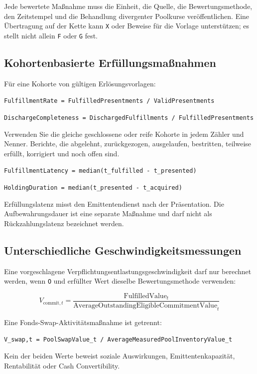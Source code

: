 \documentclass[11pt]{article}
\begin{document}
Jede bewertete Maßnahme muss die Einheit, die Quelle, die Bewertungsmethode, den Zeitstempel und die Behandlung divergenter Poolkurse veröffentlichen. Eine Übertragung auf der Kette kann \texttt{X} oder Beweise für die Vorlage unterstützen; es stellt nicht allein \texttt{F} oder \texttt{G} fest.

\subsection*{Kohortenbasierte Erfüllungsmaßnahmen}

Für eine Kohorte von gültigen Erlösungsvorlagen:

\texttt{FulfillmentRate = FulfilledPresentments / ValidPresentments}

\texttt{DischargeCompleteness = DischargedFulfillments / FulfilledPresentments}

Verwenden Sie die gleiche geschlossene oder reife Kohorte in jedem Zähler und Nenner. Berichte, die abgelehnt, zurückgezogen, ausgelaufen, bestritten, teilweise erfüllt, korrigiert und noch offen sind.

\texttt{FulfillmentLatency = median(t\_fulfilled - t\_presented)}

\texttt{HoldingDuration = median(t\_presented - t\_acquired)}

Erfüllungslatenz misst den Emittentendienst nach der Präsentation. Die Aufbewahrungsdauer ist eine separate Maßnahme und darf nicht als Rückzahlungslatenz bezeichnet werden.

\subsection*{Unterschiedliche Geschwindigkeitsmessungen}

Eine vorgeschlagene Verpflichtungsentlastungsgeschwindigkeit darf nur berechnet werden, wenn \texttt{O} und erfüllter Wert dieselbe Bewertungsmethode verwenden:

\[
V_{\mathrm{commit},t} = \frac{\mathrm{FulfilledValue}_t}{\mathrm{AverageOutstandingEligibleCommitmentValue}_t}
\]

Eine Fonds-Swap-Aktivitätsmaßnahme ist getrennt:

\texttt{V\_swap,t = PoolSwapValue\_t / AverageMeasuredPoolInventoryValue\_t}

Kein der beiden Werte beweist soziale Auswirkungen, Emittentenkapazität, Rentabilität oder Cash Convertibility.
\end{document}
